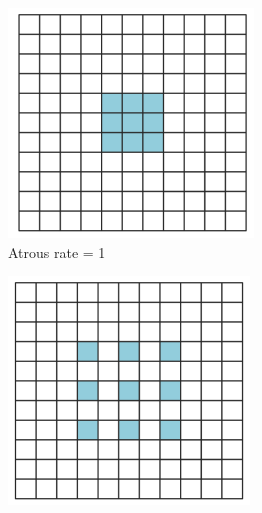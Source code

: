 	\begin{figure}
		\centering
		\begin{subfigure}{.27\textwidth}
			\centering
			\includegraphics[width=1\linewidth]{images/r_1}
			\caption{Atrous rate = 1}
		\end{subfigure}
		\begin{subfigure}{.27\textwidth}
			\centering
			\includegraphics[width=1\linewidth]{images/r_2}

\end{subfigure}
\end{figure}
